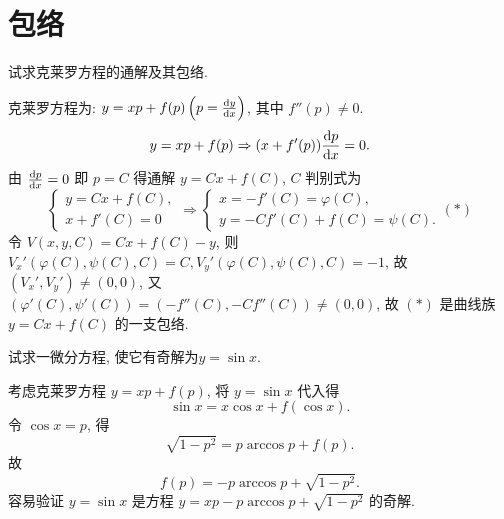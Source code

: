 \section{包络}



\begin{exercise}
  试求克莱罗方程的通解及其包络.
\end{exercise}

\begin{solution} 
  克莱罗方程为: $y=xp+f(p)\left(p=\frac{\mathop{}\!\mathrm{d} y}{\mathop{}\!\mathrm{d} x}\right)$, 其中 $f''(p)\neq0$.
  \[y=xp+f(p)\Rightarrow(x+f'(p))\frac{\mathop{}\!\mathrm{d} p}{\mathop{}\!\mathrm{d} x}=0.\]
  由 $\frac{\mathop{}\!\mathrm{d} p}{\mathop{}\!\mathrm{d} x}=0 $ 即 $p=C$ 得通解 $y=Cx+f(C)$, $C$ 判别式为
  \[\begin{cases}
      y=Cx+f(C), \\
      x+f'(C)=0
    \end{cases}\Rightarrow
    \begin{cases}
      x=-f'(C)=\varphi(C), \\
      y=-Cf'(C)+f(C)=\psi(C).
    \end{cases}(*)\]
  令 $V(x,y,C)=Cx+f(C)-y$, 则 $V_x'(\varphi(C),\psi(C),C)=C,V_y'(\varphi(C),\psi(C),C)=-1$, 
  故 $(V_x',V_y')\neq(0,0)$, 又$(\varphi'(C),\psi'(C))=(-f''(C),-Cf''(C))\neq(0,0)$, 
  故 $(*)$ 是曲线族 $y=Cx+f(C)$ 的一支包络.
\end{solution}



\begin{exercise}
  试求一微分方程, 使它有奇解为$y=\sin x$.
\end{exercise}

\begin{solution} 
  考虑克莱罗方程 $y=xp+f(p)$, 将 $y=\sin x$ 代入得
  \[\sin x=x\cos x+f(\cos x).\]
  令 $\cos x=p$, 得
  \[\sqrt{1-p^2}=p\arccos p+f(p).\]
  故
  \[f(p)=-p\arccos p+\sqrt{1-p^2}.\]
  容易验证 $y=\sin x$ 是方程 $y=xp-p\arccos p+\sqrt{1-p^2}$ 的奇解.
\end{solution}